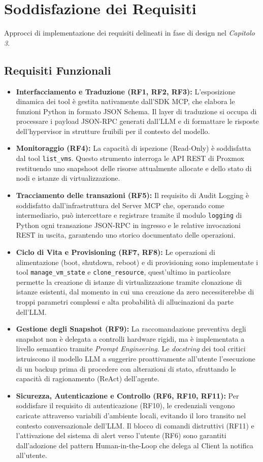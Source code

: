 \section{Soddisfazione dei Requisiti}
Approcci di implementazione dei requisiti delineati in fase di design nel \textit{Capitolo 3}.

\subsection{Requisiti Funzionali}
\begin{itemize}
    \item \textbf{Interfacciamento e Traduzione (RF1, RF2, RF3):} L'esposizione dinamica dei tool è gestita nativamente dall'SDK MCP, che elabora le funzioni Python in formato JSON Schema. Il layer di traduzione si occupa di processare i payload JSON-RPC generati dall'LLM e di formattare le risposte dell'hypervisor in strutture fruibili per il contesto del modello.
    \item \textbf{Monitoraggio (RF4):} La capacità di ispezione (Read-Only) è soddisfatta dal tool \texttt{list\_vms}. Questo strumento interroga le API REST di Proxmox restituendo uno snapshoot delle risorse attualmente allocate e dello stato di nodi e istanze di virtualizzazione.
    \item \textbf{Tracciamento delle transazioni (RF5):} Il requisito di Audit Logging è soddisfatto dall'infrastruttura del Server MCP che, operando come intermediario, può intercettare e registrare tramite il modulo \texttt{logging} di Python ogni transazione JSON-RPC in ingresso e le relative invocazioni REST in uscita, garantendo uno storico documentato delle operazioni.
    \item \textbf{Ciclo di Vita e Provisioning (RF7, RF8):} Le operazioni di alimentazione (boot, shutdown, reboot) e di provisioning sono implementate i tool \texttt{manage\_vm\_state} e \texttt{clone\_resource}, quest'ultimo in particolare permette la creazione di istanze di virtualizzazione tramite clonazione di istanze esistenti, dal momento in cui una creazione da zero necessiterebbe di troppi parametri complessi e alta probabilità di allucinazioni da parte dell'LLM.
    \item \textbf{Gestione degli Snapshot (RF9):} La raccomandazione preventiva degli snapshot non è delegata a controlli hardware rigidi, ma è implementata a livello semantico tramite \textit{Prompt Engineering}. Le \textit{docstring} dei tool critici istruiscono il modello LLM a suggerire proattivamente all'utente l'esecuzione di un backup prima di procedere con alterazioni di stato, sfruttando le capacità di ragionamento (ReAct) dell'agente.
    \item \textbf{Sicurezza, Autenticazione e Controllo (RF6, RF10, RF11):} Per soddisfare il requisito di autenticazione (RF10), le credenziali vengono caricate attraverso variabili d'ambiente locali, evitando il loro transito nel contesto conversazionale dell'LLM. Il blocco di comandi distruttivi (RF11) e l'attivazione del sistema di alert verso l'utente (RF6) sono garantiti dall'adozione del pattern Human-in-the-Loop che delega al Client la notifica all'utente.
\end{itemize}

